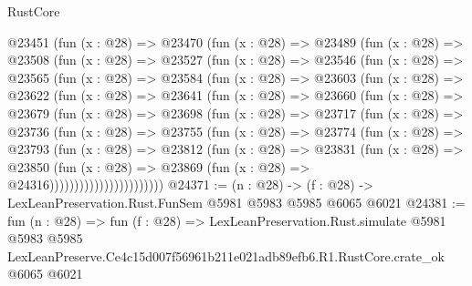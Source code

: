 \begin{lexlean}{RustCore}
\begin{coremodule}
  @23451
    (fun (x : @28) =>
    @23470
      (fun (x : @28) =>
      @23489
        (fun (x : @28) =>
        @23508
          (fun (x : @28) =>
          @23527
            (fun (x : @28) =>
            @23546
              (fun (x : @28) =>
              @23565
                (fun (x : @28) =>
                @23584
                  (fun (x : @28) =>
                  @23603
                    (fun (x : @28) =>
                    @23622
                      (fun (x : @28) =>
                      @23641
                        (fun (x : @28) =>
                        @23660
                          (fun (x : @28) =>
                          @23679
                            (fun (x : @28) =>
                            @23698
                              (fun (x : @28) =>
                              @23717
                                (fun (x : @28) =>
                                @23736
                                  (fun (x : @28) =>
                                  @23755
                                    (fun (x : @28) =>
                                    @23774
                                      (fun (x : @28) =>
                                      @23793
                                        (fun (x : @28) =>
                                        @23812
                                          (fun (x : @28) =>
                                          @23831
                                            (fun (x : @28) =>
                                            @23850
                                              (fun (x : @28) =>
                                              @23869 (fun (x : @28) => @24316)))))))))))))))))))))))
@24371 := (n : @28) -> (f : @28) -> LexLeanPreservation.Rust.FunSem @5981 @5983 @5985 @6065 @6021
@24381 := fun (n : @28) =>
  fun (f : @28) =>
  LexLeanPreservation.Rust.simulate
    @5981
    @5983
    @5985
    LexLeanPreserve.Ce4c15d007f56961b211e021adb89efb6.R1.RustCore.crate_ok
    @6065
    @6021
\end{coremodule}
\end{lexlean}
